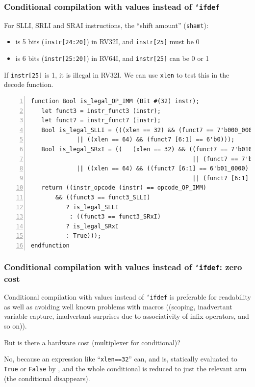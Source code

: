 \begin{frame}[fragile]
\frametitle{Conditional compilation with values instead of {\tt `ifdef}}

\footnotesize

For SLLI, SRLI and SRAI instructions, the ``shift amount'' ({\tt shamt}):
\begin{itemize}
 \item is 5 bits ({\tt instr[24:20]}) in RV32I, and {\tt instr[25]} must be 0
 \item is 6 bits ({\tt instr[25:20]}) in RV64I, and {\tt instr[25]} can be 0 or 1
\end{itemize}
If {\tt instr[25]} is 1, it is illegal in RV32I.
We can use {\tt xlen} to test this in the decode function.

\vspace{2ex}

\begin{Verbatim}[frame=single, numbers=left, label=in src\_Common/Instr\_Bits.bsv]
function Bool is_legal_OP_IMM (Bit #(32) instr);
   let funct3 = instr_funct3 (instr);
   let funct7 = instr_funct7 (instr);
   Bool is_legal_SLLI = (((xlen == 32) && (funct7 == 7'b000_0000))
			 || ((xlen == 64) && (funct7 [6:1] == 6'b0)));
   Bool is_legal_SRxI = ((   (xlen == 32) && ((funct7 == 7'b010_0000)
                                              || (funct7 == 7'b000_0000)))
			 || ((xlen == 64) && ((funct7 [6:1] == 6'b01_0000)
                                              || (funct7 [6:1] == 6'b00_0000))));
   return ((instr_opcode (instr) == opcode_OP_IMM)
	   && ((funct3 == funct3_SLLI)
	      ? is_legal_SLLI
	       : ((funct3 == funct3_SRxI)
		  ? is_legal_SRxI
		  : True)));
endfunction
\end{Verbatim}

\end{frame}


\begin{frame}[fragile]
\frametitle{Conditional compilation with values instead of {\tt `ifdef}: zero cost}

\footnotesize

Conditional compilation with values instead of {\tt `ifdef} is
preferable for readability as well as avoiding well known problems
with macros ((scoping, inadvertant variable capture, inadvertant
surprises due to associativity of infix operators, and so on)).

\vspace{4ex}

But is there a hardware cost (multiplexer for conditional)?

\vspace{2ex}

No, because an expression like ``{\tt xlen==32}'' can, and is,
statically evaluated to {\tt True} or {\tt False} by {\bsc}, and the
whole conditional is reduced to just the relevant arm (the conditional
disappears).

\end{frame}






